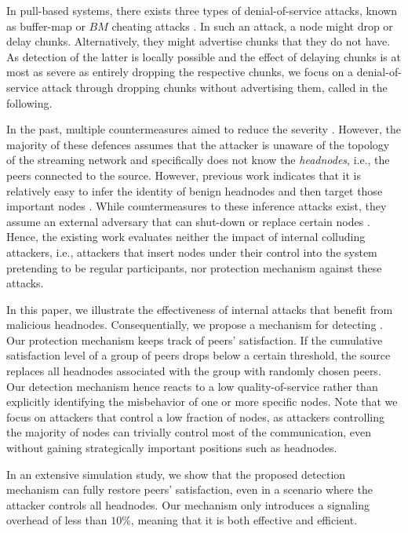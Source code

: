In pull-based systems, there exists three types of denial-of-service attacks, known as buffer-map or $BM$ cheating attacks \cite{cheatingAnalysis}. 
In such an attack, a node might drop or delay chunks. Alternatively, they might advertise chunks that they do not have. As detection of the latter is locally possible and the effect of delaying chunks is at most as severe as entirely dropping the respective chunks, we focus on a denial-of-service attack through dropping chunks without advertising them, called \drop in the following.  


In the past, multiple countermeasures aimed to reduce the severity \drop. However, the majority of these defences \cite{zhang2005coolstreaming, defending2, antiliar} assumes that the attacker is unaware of the topology of the streaming network and specifically does not know the \emph{headnodes}, i.e., the peers connected to the source. 
However, previous work indicates that it is relatively easy to infer the identity of benign headnodes and then target those important nodes \cite{nguyen2016swap}.
While countermeasures to these inference attacks exist, they assume an external adversary that can shut-down or replace certain nodes \cite{nguyen2016swap, rbcs, nguyen2014resilience}. 
Hence, the existing work evaluates neither the impact of internal colluding attackers, i.e., attackers that insert nodes under their control into the system pretending to be regular participants, nor protection mechanism against these attacks.


In this paper, we  illustrate the effectiveness of internal attacks that benefit from malicious headnodes. 
Consequentially, we propose a mechanism for detecting \drop. Our protection mechanism keeps track of peers' satisfaction. 
If the cumulative satisfaction level of a group of peers drops below a certain threshold, the source replaces all headnodes associated with the group with randomly chosen peers. 
Our detection mechanism hence reacts to a low quality-of-service rather than explicitly identifying the misbehavior of one or more specific nodes.
Note that we focus on attackers that control a low fraction of nodes, as attackers controlling the majority of nodes can trivially control most of the communication, even without gaining strategically important positions such as headnodes.    

In an extensive simulation study, we show that the proposed detection mechanism can fully restore peers' satisfaction, even in a scenario where the attacker controls all headnodes. 
Our mechanism only introduces a signaling overhead of less than $10\%$, meaning that it is both effective and efficient.

